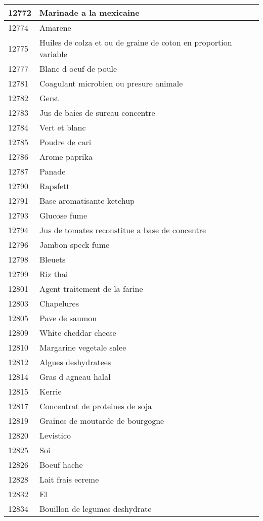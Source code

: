 \begin{longtable}{|l|l|}
12772 & Marinade a la mexicaine \\ \hline 
12774 & Amarene \\ \hline 
12775 & Huiles de colza et ou de graine de coton en proportion variable \\ \hline 
12777 & Blanc d oeuf de poule \\ \hline 
12781 & Coagulant microbien ou presure animale \\ \hline 
12782 & Gerst \\ \hline 
12783 & Jus de baies de sureau concentre \\ \hline 
12784 & Vert et blanc \\ \hline 
12785 & Poudre de cari \\ \hline 
12786 & Arome paprika \\ \hline 
12787 & Panade \\ \hline 
12790 & Rapsfett \\ \hline 
12791 & Base aromatisante ketchup \\ \hline 
12793 & Glucose fume \\ \hline 
12794 & Jus de tomates reconstitue a base de concentre \\ \hline 
12796 & Jambon speck fume \\ \hline 
12798 & Bleuets \\ \hline 
12799 & Riz thai \\ \hline 
12801 & Agent traitement de la farine \\ \hline 
12803 & Chapelures \\ \hline 
12805 & Pave de saumon \\ \hline 
12809 & White cheddar cheese \\ \hline 
12810 & Margarine vegetale salee \\ \hline 
12812 & Algues deshydratees \\ \hline 
12814 & Gras d agneau halal \\ \hline 
12815 & Kerrie \\ \hline 
12817 & Concentrat de proteines de soja \\ \hline 
12819 & Graines de moutarde de bourgogne \\ \hline 
12820 & Levistico \\ \hline 
12825 & Soi \\ \hline 
12826 & Boeuf hache \\ \hline 
12828 & Lait frais ecreme \\ \hline 
12832 & El \\ \hline 
12834 & Bouillon de legumes deshydrate \\ \hline 

\end{longtable}
